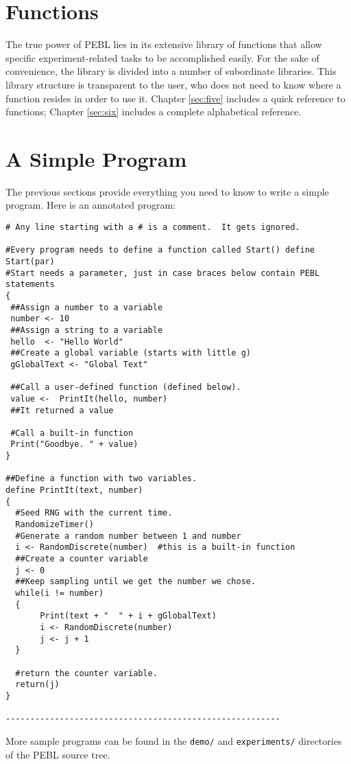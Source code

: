 \section{Functions}

The true power of PEBL lies in its extensive library of
functions that allow specific experiment-related tasks to be
accomplished easily. For the sake of convenience, the library is divided into a number of subordinate libraries.  This library structure
is transparent to the user, who does not need to know where
a function resides in order to use it. Chapter \ref{sec:five} includes a quick reference to functions; Chapter \ref{sec:six} includes a complete alphabetical reference.


\section{ A Simple Program}

The previous sections provide everything you need to know to
write a simple program.  Here is an annotated program:

\begin{verbatim}
# Any line starting with a # is a comment.  It gets ignored.

#Every program needs to define a function called Start() define Start(par)
#Start needs a parameter, just in case braces below contain PEBL statements
{
 ##Assign a number to a variable
 number <- 10
 ##Assign a string to a variable
 hello  <- "Hello World"
 ##Create a global variable (starts with little g)
 gGlobalText <- "Global Text"

 ##Call a user-defined function (defined below).
 value <-  PrintIt(hello, number)
 ##It returned a value

 #Call a built-in function
 Print("Goodbye. " + value)
}

##Define a function with two variables.
define PrintIt(text, number)
{
  #Seed RNG with the current time.
  RandomizeTimer()
  #Generate a random number between 1 and number
  i <- RandomDiscrete(number)  #this is a built-in function
  ##Create a counter variable
  j <- 0
  ##Keep sampling until we get the number we chose.
  while(i != number)
  {
       Print(text + "  " + i + gGlobalText)
       i <- RandomDiscrete(number)
       j <- j + 1
  }

  #return the counter variable.
  return(j)
}

--------------------------------------------------------

\end{verbatim}
More sample programs can be found in the \texttt{demo/} and \texttt{experiments/} directories of the PEBL source tree.


